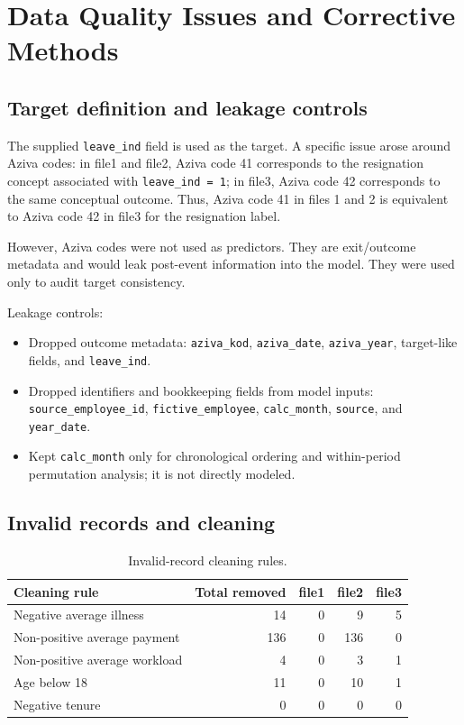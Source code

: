 \documentclass[11pt]{article}
\newcommand{\feature}[1]{\texttt{#1}}
\begin{document}
\section{Data Quality Issues and Corrective Methods}

\subsection{Target definition and leakage controls}

The supplied \feature{leave\_ind} field is used as the target. A specific issue arose around Aziva codes: in file1 and file2, Aziva code 41 corresponds to the resignation concept associated with \feature{leave\_ind = 1}; in file3, Aziva code 42 corresponds to the same conceptual outcome. Thus, Aziva code 41 in files 1 and 2 is equivalent to Aziva code 42 in file3 for the resignation label.

However, Aziva codes were not used as predictors. They are exit/outcome metadata and would leak post-event information into the model. They were used only to audit target consistency.

Leakage controls:
\begin{itemize}
    \item Dropped outcome metadata: \feature{aziva\_kod}, \feature{aziva\_date}, \feature{aziva\_year}, target-like fields, and \feature{leave\_ind}.
    \item Dropped identifiers and bookkeeping fields from model inputs: \feature{source\_employee\_id}, \feature{fictive\_employee}, \feature{calc\_month}, \feature{source}, and \feature{year\_date}.
    \item Kept \feature{calc\_month} only for chronological ordering and within-period permutation analysis; it is not directly modeled.
\end{itemize}

\subsection{Invalid records and cleaning}

\begin{table}[H]
\centering
\caption{Invalid-record cleaning rules.}
\begin{tabular}{lrrrr}
\toprule
Cleaning rule & Total removed & file1 & file2 & file3 \\
\midrule
Negative average illness & 14 & 0 & 9 & 5 \\
Non-positive average payment & 136 & 0 & 136 & 0 \\
Non-positive average workload & 4 & 0 & 3 & 1 \\
Age below 18 & 11 & 0 & 10 & 1 \\
Negative tenure & 0 & 0 & 0 & 0 \\
\bottomrule
\end{tabular}
\end{table}
\end{document}
